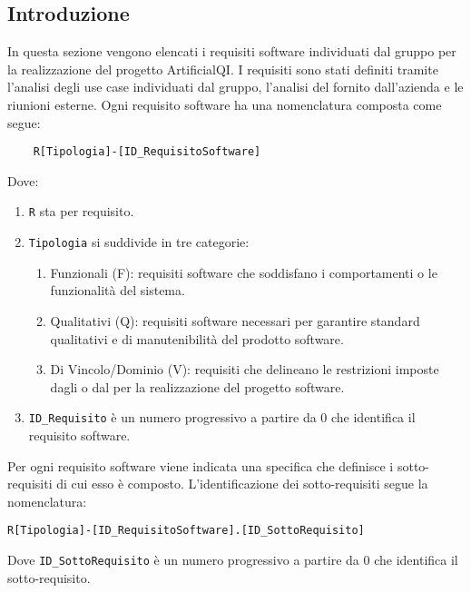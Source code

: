 
\subsection{Introduzione}
\label{sec:requisiti_software}
In questa sezione vengono elencati i requisiti software individuati dal gruppo per la realizzazione del progetto ArtificialQI.
I requisiti sono stati definiti tramite l'analisi degli use case individuati dal gruppo, l'analisi del  fornito dall'azienda e le riunioni esterne.
Ogni requisito software ha una nomenclatura composta come segue:
\begin{lstlisting}
    R[Tipologia]-[ID_RequisitoSoftware]
\end{lstlisting}
Dove:
\begin{enumerate}
    \item \lstinline|R| sta per requisito.
    \item \lstinline|Tipologia| si suddivide in tre categorie:
    \begin{enumerate}
        \item Funzionali (F): requisiti software che soddisfano i comportamenti o le funzionalità del sistema.
        \item Qualitativi (Q): requisiti software necessari per garantire standard qualitativi e di manutenibilità
        del prodotto software.
        \item Di Vincolo/Dominio (V): requisiti che delineano le restrizioni imposte dagli  o dal  
        per la realizzazione del progetto software.
    \end{enumerate}
    \item \lstinline|ID_Requisito| è un numero progressivo a partire da 0 che identifica il requisito software.
\end{enumerate}  
Per ogni requisito software viene indicata una specifica che definisce i sotto-requisiti di cui esso è composto.
L'identificazione dei sotto-requisiti segue la nomenclatura:
\begin{lstlisting}
R[Tipologia]-[ID_RequisitoSoftware].[ID_SottoRequisito]
\end{lstlisting} 
Dove \lstinline|ID_SottoRequisito| è un numero progressivo a partire da 0 che identifica il sotto-requisito.
